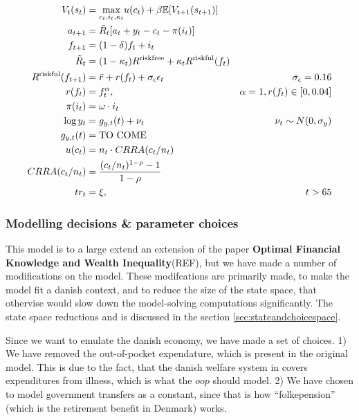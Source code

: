 \begin{align}
    V_t(s_t) &= \underset{c_t, i_t, \kappa_t}{\max} u(c_t) + \beta \mathbb{E} [V_{t+1}(s_{t+1})] \\
    a_{t+1} &= \tilde{R}_t [a_t + y_t - c_t - \pi(i_t)] \\
    f_{t+1} &= (1-\delta)f_t + i_t \\
    \tilde{R}_t &= (1-\kappa_t) R^{\text{riskfree}} + \kappa_t R^{\text{riskful}}(f_t) \\
    R^{\text{riskful}}(f_{t+1}) &= \bar{r} + r(f_t) + \sigma_{\epsilon} \epsilon_t & \sigma_\epsilon = 0.16 \\
    r(f_t) &= f_t^{\alpha}, &\alpha = 1, r(f_t)\in [0, 0.04] \\
    \pi(i_t) &= \omega \cdot i_t \\
    \log y_t &= g_{y, t}(t) + \nu_{t} &\nu_{t} \sim N(0, \sigma_y) \\
    g_{y,t}(t) &= \text{TO COME}\\
    u (c_t) &= n_t \cdot CRRA(c_t / n_t) \\
    CRRA(c_t / n_t) &= \frac{(c_t/n_t)^{1-\rho} - 1}{1-\rho} \\
    tr_t &= \xi, &t>65
\end{align}

\subsubsection{Modelling decisions \& parameter choices}

This model is to a large extend an extension of the paper \textbf{Optimal Financial Knowledge and Wealth Inequality}(REF), but we have made a number of modifications on the model. These modifcations are primarily made, to make the model fit a danish context, and to reduce the size of the state space, that othervise would slow down the model-solving computations significantly. The state space reductions and is discussed in the section \ref{sec:stateandchoicespace}.

Since we want to emulate the danish economy, we have made a set of choices. 1) We have removed the out-of-pocket expendature, which is present in the original model. This is due to the fact, that the danish welfare system in covers expenditures from illness, which is what the $oop$ should model. 2) We have chosen to model government transfers as a constant, since that is how ``folkepension'' (which is the retirement benefit in Denmark) works.

